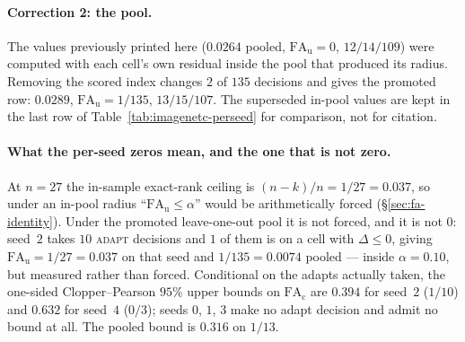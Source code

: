\paragraph{Correction 2: the pool.} The values previously printed here ($0.0264$ pooled,
$\mathrm{FA}_{\mathrm u}=0$, $12/14/109$) were computed with each cell's own residual inside the
pool that produced its radius. Removing the scored index changes $2$ of $135$ decisions and gives
the promoted row: $0.0289$, $\mathrm{FA}_{\mathrm u}=1/135$, $13/15/107$. The superseded in-pool
values are kept in the last row of Table~\ref{tab:imagenetc-perseed} for comparison, not for
citation.

\paragraph{What the per-seed zeros mean, and the one that is not zero.} At $n=27$ the in-sample
exact-rank ceiling is $(n-k)/n=1/27=0.037$, so under an in-pool radius
``$\mathrm{FA}_{\mathrm u}\le\alpha$'' would be arithmetically forced
(\S\ref{sec:fa-identity}). Under the promoted leave-one-out pool it is not forced, and it is not
$0$: seed~$2$ takes $10$ \textsc{adapt} decisions and $1$ of them is on a cell with $\Delta\le0$,
giving $\mathrm{FA}_{\mathrm u}=1/27=0.037$ on that seed and $1/135=0.0074$ pooled --- inside
$\alpha=0.10$, but measured rather than forced. Conditional on the adapts actually taken, the
one-sided Clopper--Pearson $95\%$ upper bounds on $\mathrm{FA}_{\mathrm c}$ are $0.394$ for seed~$2$
($1/10$) and $0.632$ for seed~$4$ ($0/3$); seeds $0$, $1$, $3$ make no adapt decision and
admit no bound at all. The pooled bound is $0.316$ on $1/13$.

